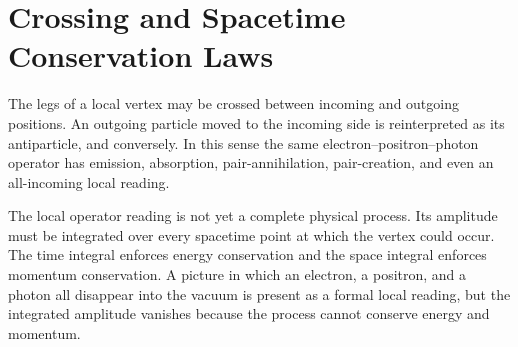 \section{Crossing and Spacetime Conservation Laws}

The legs of a local vertex may be crossed between incoming and outgoing positions. An outgoing particle moved to the incoming side is reinterpreted as its antiparticle, and conversely. In this sense the same electron--positron--photon operator has emission, absorption, pair-annihilation, pair-creation, and even an all-incoming local reading.

\begin{classroomqa}
\end{classroomqa}

The local operator reading is not yet a complete physical process. Its amplitude must be integrated over every spacetime point at which the vertex could occur. The time integral enforces energy conservation and the space integral enforces momentum conservation. A picture in which an electron, a positron, and a photon all disappear into the vacuum is present as a formal local reading, but the integrated amplitude vanishes because the process cannot conserve energy and momentum.

\begin{classroomqa}
\end{classroomqa}

\begin{classroomqa}
\end{classroomqa}


